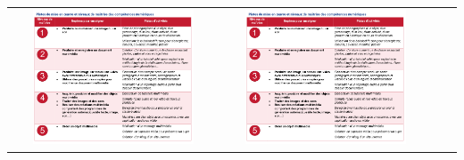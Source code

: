 \documentclass[
  11pt,
]{article}
\begin{document}
\begin{center}

\begin{tabular}{cccc}

\begin{minipage}{0.2\linewidth}

\includegraphics[width=0.8\textwidth,height=\textheight]{image.png}

\end{minipage} &

\begin{minipage}{0.2\linewidth}

\includegraphics[width=0.8\textwidth,height=\textheight]{image.png}

\end{minipage} &

\begin{minipage}{0.2\linewidth}


\end{minipage}
\end{tabular}
\end{center}
\end{document}
